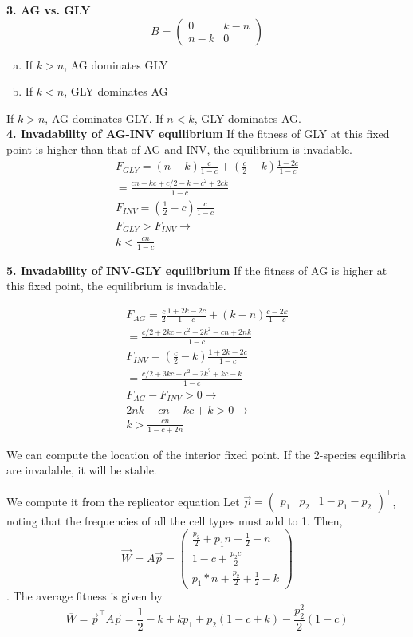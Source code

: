 \documentclass[12pt]{report}
\begin{document}
 
 \textbf{3. AG vs. GLY}
$$B = \begin{pmatrix}
0 & k -n\\
n -k & 0 
\end{pmatrix} $$

\begin{enumerate}[(a)]
\item If $k > n$, AG dominates GLY
\item If $k < n$, GLY dominates AG
\end{enumerate}
If $k > n$, AG dominates GLY. If $n < k$, GLY dominates AG. \\

\textbf{4. Invadability of AG-INV equilibrium}
If the fitness of GLY at this fixed point is higher than that of AG and INV, the equilibrium is invadable. 
\begin{gather*}
F_{GLY} = (n - k) \frac{c}{1-c} + (\frac{c}{2} - k) \frac{1 - 2c}{1 -c} \\
 = \frac{cn - kc + c / 2 - k - c^2 + 2ck}{1 -c} \\
F_{INV} = (\frac{1}{2} - c) \frac{c}{1 -c} \\
F_{GLY} > F_{INV} \rightarrow \\
k < \frac{cn}{1-c}
\end{gather*}

\textbf{5. Invadability of INV-GLY equilibrium}
If the fitness of AG is higher at this fixed point, the equilibrium is invadable. 

\begin{gather*}
F_{AG} = \frac{c}{2} \frac{1 + 2 k  - 2 c}{1 - c} + (k - n) \frac{c - 2k}{1-c} \\
 = \frac{c / 2 + 2 k c - c^2 - 2 k ^2 - c n + 2n k}{1 - c} \\
F_{INV} = (\frac{c}{2} - k) \frac{1 + 2 k - 2 c}{1 -c}  \\
= \frac{c / 2 + 3 k c - c ^ 2 - 2 k ^2 + k c - k}{1 - c}  \\
F_{AG} - F_{INV} > 0 \rightarrow \\
2 n k - c n - k c + k > 0 \rightarrow \\ 
k > \frac{cn}{1 - c + 2n}
\end{gather*}


We can compute the location of the interior fixed point. If the 2-species equilibria are invadable, it will be stable. 

We compute it from the replicator equation
Let $\vec{p} = { \begin{pmatrix} p_1 & p_2 & 1-p_1-p_2 \end{pmatrix}}^\top$, noting that the frequencies of all the cell types must add to 1. Then, $$\vec{W} = A\vec{p} = 
{\begin{pmatrix} \frac{p_2}{2} + p_1 n + \frac{1}{2}-n\\
1-c + \frac{p_2 c}{2}\\ %
p_1*n+\frac{p_2}{2} + \frac{1}{2}-k \end{pmatrix}}$$. The average fitness is given by  $$\overline{W} = \vec{p}^\top A \vec{p} = \frac{1}{2}-k+ k p_1 + p_2 (1 - c + k) - \frac{p_2^2}{2} (1-c) $$
\end{document}
